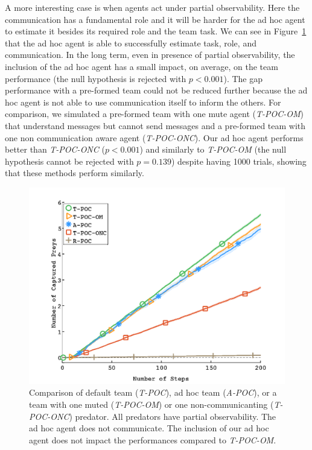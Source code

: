A more interesting case is when agents act under partial observability. Here the communication has a fundamental role and it will be harder for the ad hoc agent to estimate it besides its required role and the team task. We can see in Figure~\ref{fig:partialobscom} that the ad hoc agent is able to successfully estimate task, role, and communication. In the long term, even in presence of partial observability, the inclusion of the ad hoc agent has a small impact, on average, on the team performance (the null hypothesis is rejected with {\small$p<0.001$}). The gap performance with a pre-formed team could not be reduced further because the ad hoc agent is not able to use communication itself to inform the others. For comparison, we simulated a pre-formed team with one mute agent (\emph{T-POC-OM}) that understand messages but cannot send messages and a pre-formed team with one non communication aware agent (\emph{T-POC-ONC}). Our ad hoc agent performs better than \emph{T-POC-ONC} ({\small$p<0.001$}) and similarly to \emph{T-POC-OM} (the null hypothesis cannot be rejected with {\small$p=0.139$}) despite having 1000 trials, showing that these methods perform similarly.

\begin{figure}[htbp!]
  \centering
  \includegraphics[trim=2.6cm 0.4cm 2.7cm 1.8cm, clip=true, width=0.8\columnwidth]{plots/with_noise/partialObsCom.png}
  \caption{Comparison of default team (\emph{T-POC}), ad hoc team (\emph{A-POC}), or a team with one muted (\emph{T-POC-OM}) or one non-communicanting (\emph{T-POC-ONC}) predator. All predators have partial observability. The ad hoc agent does not communicate. The inclusion of our ad hoc agent does not impact the performances compared to \emph{T-POC-OM}.}
  \label{fig:partialobscom}
\end{figure}

